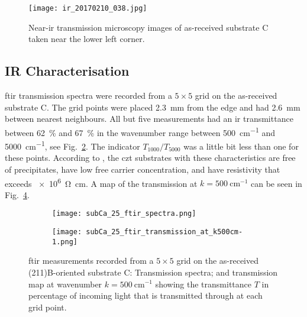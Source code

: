 \begin{figure}[htbp]
    \centering
    \texttt{[image: ir\_20170210\_038.jpg]}
    \caption[Near-\ac{ir} transmission microscopy of as-received substrate C.]{Near-\ac{ir} transmission microscopy images of as-received substrate C taken near the lower left corner.}
    \label{fig:subCa_irt}
\end{figure}

\subsection{IR Characterisation}

\Ac{ftir} transmission spectra were recorded from a $5\times5$ grid on the as-received substrate C. The grid points were placed \SI{2.3}{\milli\metre} from the edge and had \SI{2.6}{\milli\metre} between nearest neighbours. All but five measurements had an \ac{ir} transmittance between \SI{62}{\percent} and \SI{67}{\percent} in the wavenumber range between \SI{500}{\centi\metre^{-1}} and \SI{5000}{\centi\metre^{-1}}, see Fig.~\ref{fig:subCa_ftir_spectra}. The indicator $T_{1000}/T_{5000}$ was a little bit less than one for these points. According to \citet{yujie2004infrared}, the \ac{czt} substrates with these characteristics are free of precipitates, have low free carrier concentration, and have resistivity that exceeds \SI{e6}{\ohm\centi\metre}. A map of the transmission at $k=\SI{500}{\centi\metre^{-1}}$ can be seen in Fig.~\ref{fig:subCa_ftir_map_500cm-1}.

\begin{figure}[htbp]
    \centering
    \begin{subfigure}[t]{0.60175438596\linewidth}
        \texttt{[image: subCa\_25\_ftir\_spectra.png]}
        \caption{}\label{fig:subCa_ftir_spectra}
    \end{subfigure}
    \hfill
    \begin{subfigure}[t]{0.37824561403\linewidth}
        \texttt{[image: subCa\_25\_ftir\_transmission\_at\_k500cm-1.png]}
        \caption{}\label{fig:subCa_ftir_map_500cm-1}
    \end{subfigure}
    \caption[\Ac{ftir} measurements of the as-received substrate C.]{\Acf{ftir} measurements recorded from a $5\times5$ grid on the as-received (211)B-oriented substrate C:  Transmission spectra; and  transmission map at wavenumber $k=\SI{500}{\centi\metre^{-1}}$ showing the transmittance $T$ in percentage of incoming light that is transmitted through at each grid point.}
\end{figure}

